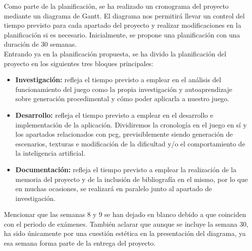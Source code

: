     Como parte de la planificación, se ha realizado un cronograma del proyecto mediante un diagrama de Gantt. El diagrama nos permitirá llevar un control del tiempo previsto para cada apartado del proyecto y realizar modificaciones en la planificación si es necesario. Inicialmente, se propone una planificación con una duración de 30 semanas.\\
    
    Entrando ya en la planificación propuesta, se ha divido la planificación del proyecto en los siguientes tres bloques principales:
    
    \begin{itemize}
        \item \textbf{Investigación:} refleja el tiempo previsto a emplear en el análisis del funcionamiento del juego como la propia investigación y autoaprendizaje sobre generación procedimental y cómo poder aplicarla a nuestro juego.
        \item \textbf{Desarrollo:} refleja el tiempo previsto a emplear en el desarrollo e implementación de la aplicación. Dividiremos la cronología en el juego en sí y los apartados relacionados con \acrshort{pcg}, previsiblemente siendo generación de escenarios, texturas e modificación de la dificultad y/o el comportamiento de la inteligencia artificial.
        \item \textbf{Documentación:} refleja el tiempo previsto a emplear la realización de la memoria del proyecto y de la inclusión de bibliografía en el mismo, por lo que en muchas ocasiones, se realizará en paralelo junto al apartado de investigación.
    \end{itemize}
    
    Mencionar que las semanas 8 y 9 se han dejado en blanco debido a que coinciden con el periodo de exámenes. También aclarar que aunque se incluye la semana 30, ha sido únicamente por una cuestión estética en la presentación del diagrama, ya esa semana forma parte de la entrega del proyecto.


